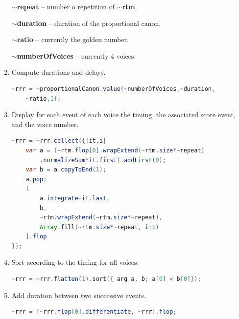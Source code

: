 \begin{enumerate}
\textbf{$\sim$repeat} -- number o repetition of \textbf{$\sim$rtm}.

\textbf{$\sim$duration} -- duration of the proportional canon.

\textbf{$\sim$ratio} -- currently the golden number.

\textbf{$\sim$numberOfVoices} -- currently 4 voices.

 \item Compute durations and delays.
\begin{lstlisting}[basicstyle=\footnotesize\ttfamily,language=Java]
~rrr = ~proportionalCanon.value(~numberOfVoices,~duration,
	~ratio,1);
 \end{lstlisting}
 \item Display for each event of each voice the timing, the associated score event, and the voice number.
 \begin{lstlisting}[basicstyle=\footnotesize\ttfamily,language=Java]
~rrr = ~rrr.collect({|it,i|
	var a = (~rtm.flop[0].wrapExtend(~rtm.size*~repeat)
		.normalizeSum*it.first).addFirst(0);
	var b = a.copyToEnd(1);
	a.pop;
	[
		a.integrate+it.last,
		b,
		~rtm.wrapExtend(~rtm.size*~repeat),
		Array.fill(~rtm.size*~repeat, i+1)
	].flop
});
\end{lstlisting}

 \item Sort according to the timing for all voices.
 \begin{lstlisting}[basicstyle=\footnotesize\ttfamily,language=Java]
~rrr = ~rrr.flatten(1).sort({ arg a, b; a[0] < b[0]});
\end{lstlisting}
 \item Add duration between two successive events.
 \begin{lstlisting}[basicstyle=\footnotesize\ttfamily,language=Java]
~rrr = [~rrr.flop[0].differentiate, ~rrr].flop;
\end{lstlisting}

 
 \end{enumerate}
 
